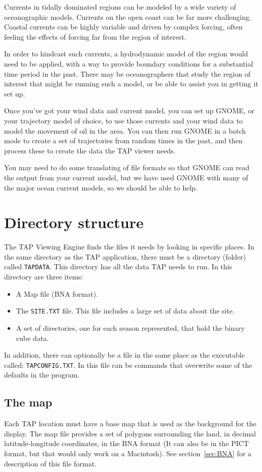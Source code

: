 \documentclass[12pt]{article}      %
\newcommand{\tap}{\textsf{TAP}\xspace}
\newcommand{\filename}[1]{\texttt{#1}}
\begin{document}
Currents in tidally dominated regions can be modeled by a wide variety of oceanographic models. Currents on the open coast can be far more challenging. Coastal currents can be highly variable and driven by complex forcing, often feeling the effects of forcing far from the region of interest.

In order to hindcast such currents, a hydrodynamic model of the region would need to be applied, with a way to provide boundary conditions for a substantial time period in the past. There may be oceanographers that study the region of interest that might be running such a model, or be able to assist you in getting it set up.

Once you've got your wind data and current model, you can set up GNOME, or your trajectory model of choice, to use those currents and your wind data to model the movement of oil in the area. You can then run GNOME in a batch mode to create a set of trajectories from random times in the past, and then process these to create the data the TAP viewer needs.

You may need to do some translating of file formats so that GNOME can read the output from your current model, but we have used GNOME with many of the major ocean current models, so we should be able to help.
 
\section{Directory structure}

The \tap Viewing Engine finds the files it needs by looking in specific places.  In
the same directory as the \tap application, there must be a
directory (folder) called \filename{TAPDATA}.  This directory has all
the data \tap needs to run.  In this directory are three items:
\begin{itemize}
\item A Map file (BNA format).
\item The \filename{SITE.TXT} file. This file includes a large set of 
data about the site.
\item A set of directories, one for each season represented, that hold 
the binary cube data.
\end{itemize}

In addition, there can optionally be a file in the same place as the
executable called: \filename{TAPCONFIG.TXT}. In this file can be
commands that overwrite some of the defaults in the program. 


\subsection{The map}
Each \tap location must have a base map that is used as the 
background for the display. The map file provides a set of polygons 
surrounding the land, in decimal latitude-longitude coordinates, in 
the BNA format (It can also be in the PICT 
format, but that would only work on a Macintosh). See 
section~\ref{sec:BNA} for a description of this file format.
\end{document}
